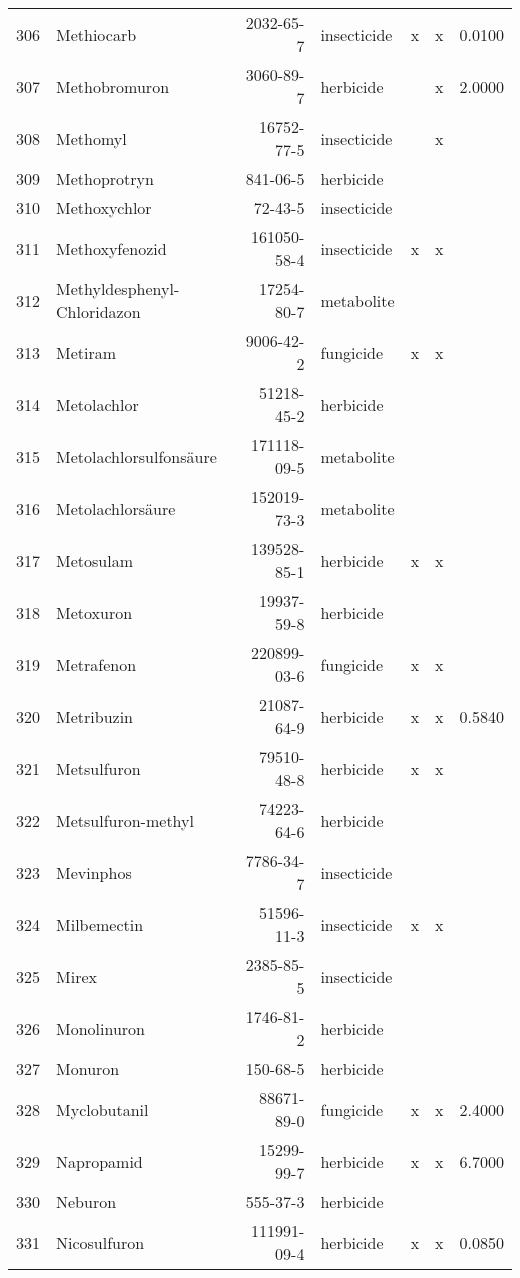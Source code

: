 \begin{longtable}{lp{4cm}rlp{1.3cm}p{1.3cm}p{1.5cm}}
  306 & Methiocarb & 2032-65-7 & insecticide & x & x & 0.0100 \\ 
  307 & Methobromuron & 3060-89-7 & herbicide &  & x & 2.0000 \\ 
  308 & Methomyl & 16752-77-5 & insecticide &  & x &  \\ 
  309 & Methoprotryn & 841-06-5 & herbicide &  &  &  \\ 
  310 & Methoxychlor & 72-43-5 & insecticide &  &  &  \\ 
  311 & Methoxyfenozid & 161050-58-4 & insecticide & x & x &  \\ 
  312 & Methyldesphenyl-Chloridazon & 17254-80-7 & metabolite &  &  &  \\ 
  313 & Metiram & 9006-42-2 & fungicide & x & x &  \\ 
  314 & Metolachlor & 51218-45-2 & herbicide &  &  &  \\ 
  315 & Metolachlorsulfonsäure & 171118-09-5 & metabolite &  &  &  \\ 
  316 & Metolachlorsäure & 152019-73-3 & metabolite &  &  &  \\ 
  317 & Metosulam & 139528-85-1 & herbicide & x & x &  \\ 
  318 & Metoxuron & 19937-59-8 & herbicide &  &  &  \\ 
  319 & Metrafenon & 220899-03-6 & fungicide & x & x &  \\ 
  320 & Metribuzin & 21087-64-9 & herbicide & x & x & 0.5840 \\ 
  321 & Metsulfuron & 79510-48-8 & herbicide & x & x &  \\ 
  322 & Metsulfuron-methyl & 74223-64-6 & herbicide &  &  &  \\ 
  323 & Mevinphos & 7786-34-7 & insecticide &  &  &  \\ 
  324 & Milbemectin & 51596-11-3 & insecticide & x & x &  \\ 
  325 & Mirex & 2385-85-5 & insecticide &  &  &  \\ 
  326 & Monolinuron & 1746-81-2 & herbicide &  &  &  \\ 
  327 & Monuron & 150-68-5 & herbicide &  &  &  \\ 
  328 & Myclobutanil & 88671-89-0 & fungicide & x & x & 2.4000 \\ 
  329 & Napropamid & 15299-99-7 & herbicide & x & x & 6.7000 \\ 
  330 & Neburon & 555-37-3 & herbicide &  &  &  \\ 
  331 & Nicosulfuron & 111991-09-4 & herbicide & x & x & 0.0850 \\ 

\end{longtable}
